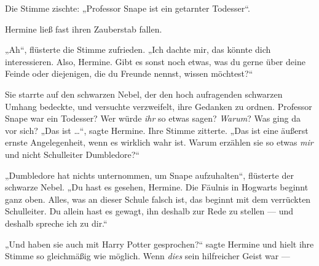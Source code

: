 Die Stimme zischte:
„Professor Snape ist ein getarnter Todesser“.

Hermine ließ fast ihren Zauberstab fallen.

„Ah“, flüsterte die Stimme zufrieden.
„Ich dachte mir, das könnte dich interessieren. Also, Hermine. Gibt es sonst noch etwas, was du gerne über deine Feinde oder diejenigen, die du Freunde nennst, wissen möchtest?“

Sie starrte auf den schwarzen Nebel, der den hoch aufragenden schwarzen Umhang bedeckte, und versuchte verzweifelt, ihre Gedanken zu ordnen. Professor Snape war ein Todesser? Wer würde \emph{ihr} so etwas sagen? \emph{Warum}? Was ging da vor sich?
„Das ist …“, sagte Hermine. Ihre Stimme zitterte.
„Das ist eine äußerst ernste Angelegenheit, wenn es wirklich wahr ist. Warum erzählen sie so etwas \emph{mir} und nicht Schulleiter Dumbledore?“

„Dumbledore hat nichts unternommen, um Snape aufzuhalten“, flüsterte der schwarze Nebel.
„Du hast es gesehen, Hermine. Die Fäulnis in Hogwarts beginnt ganz oben. Alles, was an dieser Schule falsch ist, das beginnt mit dem verrückten Schulleiter. Du allein hast es gewagt, ihn deshalb zur Rede zu stellen — und deshalb spreche ich zu dir.“

„Und haben sie auch mit Harry Potter gesprochen?“ sagte Hermine und hielt ihre Stimme so gleichmäßig wie möglich. Wenn \emph{dies} sein hilfreicher Geist war —

